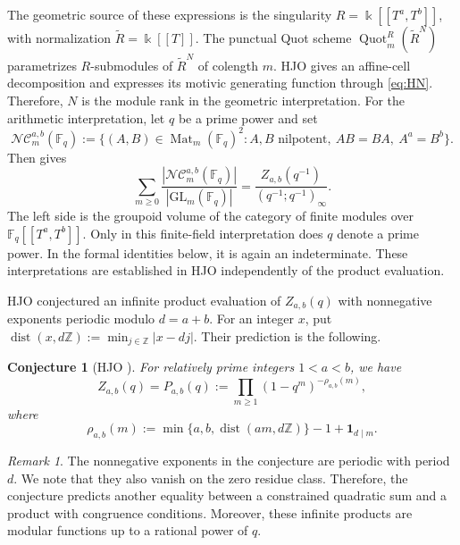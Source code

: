\documentclass[12pt,reqno]{amsart}
\numberwithin{equation}{section}
\theoremstyle{definition}
\theoremstyle{remark}
\newtheorem*{remark}{Remark}
\theoremstyle{plain}
\newtheorem{conjecture}{Conjecture}
\newcommand{\ZZ}{\mathbb Z}
\newcommand{\one}{\mathbf1}
\DeclareMathOperator{\dist}{dist}
\begin{document}
The geometric source of these expressions is the singularity
$R=\Bbbk[[T^a,T^b]]$, with normalization $\widetilde R=\Bbbk[[T]]$.
The punctual Quot scheme $\operatorname{Quot}_m^R(\widetilde R^N)$
parametrizes $R$-submodules of $\widetilde R^N$ of colength $m$.
HJO gives an affine-cell decomposition and expresses its motivic
generating function through \eqref{eq:HN}.  Therefore, $N$ is the module rank in the geometric interpretation.
For the arithmetic interpretation, let $q$ be a prime power and set
\[
 \mathcal{NC}_m^{a,b}(\mathbb F_q)
 :=\{(A,B)\in\operatorname{Mat}_m(\mathbb F_q)^2:
       A,B\text{ nilpotent},\ AB=BA,\ A^a=B^b\}.
\]
Then \cite[Theorem~1.4]{HJO} gives
\begin{equation}\label{eq:matrixvolume}
 \sum_{m\ge0}
 \frac{|\mathcal{NC}_m^{a,b}(\mathbb F_q)|}{|\mathrm{GL}_m(\mathbb F_q)|}
 =\frac{Z_{a,b}(q^{-1})}{(q^{-1};q^{-1})_\infty}.
\end{equation}
The left side is the groupoid volume of the category of finite modules over
$\mathbb F_q[[T^a,T^b]]$.
Only in this finite-field interpretation does $q$ denote a prime power.
In the formal identities below, it is again an indeterminate.
These interpretations are established in HJO independently of the
product evaluation.


HJO conjectured an infinite product evaluation of $Z_{a,b}(q)$ with nonnegative exponents periodic modulo $d=a+b$.  For an integer $x$, put $\dist(x,d\ZZ):=\min_{j\in\ZZ}|x-dj|$. Their prediction is the following.

\begin{conjecture}[{HJO \cite[Conjecture~1.7]{HJO}}]\label{conj:HJO}
For relatively prime integers $1<a<b$, we have
\begin{equation}\label{eq:HJOconj}
 Z_{a,b}(q)=P_{a,b}(q):=\prod_{m\ge1}(1-q^m)^{-\rho_{a,b}(m)},
\end{equation}
where 
$$
 \rho_{a,b}(m):=\min\{a,b,\dist(am,d\ZZ)\}-1+\one_{d\mid m}.
$$
\end{conjecture}

\begin{remark} The nonnegative exponents in the conjecture are periodic with period $d$. We note that they also vanish on the zero residue class. Therefore, the conjecture predicts another equality between a constrained quadratic sum and a product with congruence conditions. Moreover, these infinite products are modular functions up to a rational power of $q$.
\end{remark}
\end{document}
